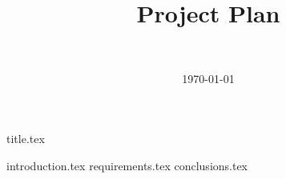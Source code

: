 \documentclass[final]{report} %
\title{Project Plan}
\author{~}
\date{\today}
\begin{document}

{title.tex}
\newpage
\tableofcontents

\newpage
{}
{introduction.tex}
{requirements.tex}
{conclusions.tex}
\newpage
{}

\end{document}
